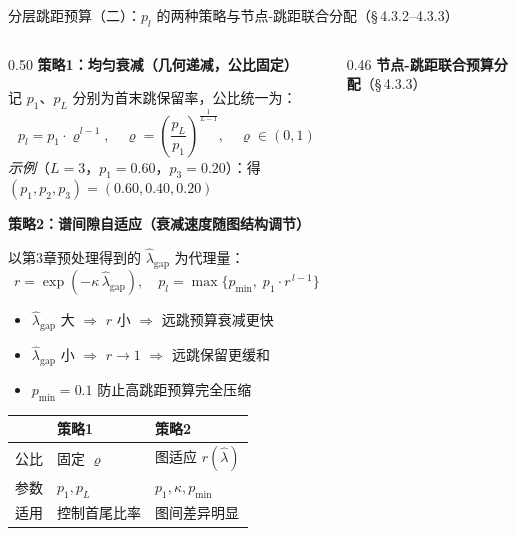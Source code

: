 \documentclass[aspectratio=169,9pt,xcolor=dvipsnames]{beamer}
\newcommand{\blue}[1]{\textcolor{mynavy}{#1}}
\begin{document}
\begin{frame}{分层跳距预算（二）：$p_l$ 的两种策略与节点-跳距联合分配（§\,4.3.2--4.3.3）}
\begin{columns}[T]
\begin{column}{0.50\textwidth}
  \textbf{\blue{策略1：均匀衰减（几何递减，公比固定）}}

  记 $p_1$、$p_L$ 分别为首末跳保留率，公比统一为：
  \begin{equation*}
    p_l = p_1\cdot\varrho^{l-1},
    \quad
    \varrho = \!\left(\frac{p_L}{p_1}\right)^{\!\frac{1}{L-1}}\!,
    \quad \varrho\in(0,1)
  \end{equation*}
  \textit{示例}（$L=3$，$p_1=0.60$，$p_3=0.20$）：得 $(p_1,p_2,p_3)=(0.60,0.40,0.20)$

  \smallskip
  \textbf{\blue{策略2：谱间隙自适应（衰减速度随图结构调节）}}

  以第3章预处理得到的 $\hat{\lambda}_{\mathrm{gap}}$ 为代理量：
  \begin{equation*}
    r = \exp(-\kappa\,\hat{\lambda}_{\mathrm{gap}}),
    \quad
    p_l = \max\!\bigl\{p_{\min},\;p_1\cdot r^{\,l-1}\bigr\}
  \end{equation*}
  \begin{itemize}\small\setlength{\itemsep}{1pt}
    \item $\hat{\lambda}_{\mathrm{gap}}$ 大 $\Rightarrow$ $r$ 小 $\Rightarrow$ 远跳预算衰减更快
    \item $\hat{\lambda}_{\mathrm{gap}}$ 小 $\Rightarrow$ $r\to1$ $\Rightarrow$ 远跳保留更缓和
    \item $p_{\min}=0.1$ 防止高跳距预算完全压缩
  \end{itemize}

  \smallskip
  {\small
  \begin{tabular}{p{1.6cm}p{1.6cm}p{2.0cm}}
    \toprule
    & 策略1 & 策略2 \\
    \midrule
    公比 & 固定 $\varrho$ & 图适应 $r(\hat{\lambda})$ \\
    参数 & $p_1,p_L$ & $p_1,\kappa,p_{\min}$ \\
    适用 & 控制首尾比率 & 图间差异明显 \\
    \bottomrule
  \end{tabular}}
\end{column}

\begin{column}{0.46\textwidth}
  \textbf{\blue{节点-跳距联合预算分配}}（§\,4.3.3）


\end{column}
\end{columns}
\end{frame}
\end{document}
